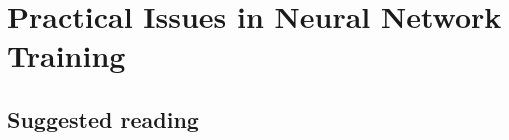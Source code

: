 \renewcommand{\prevpart}{4 }
\renewcommand{\thispart}{5 }
\renewcommand{\nextpart}{6 }

\section{Practical Issues in Neural Network Training}





\subsection{Suggested reading}

